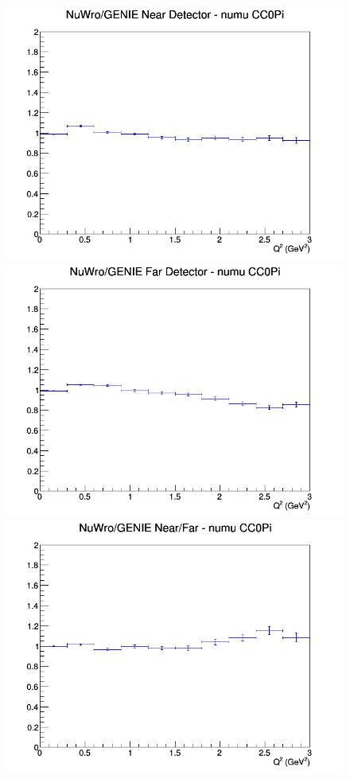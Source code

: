\begin{figure}[h]
\endminipage
\newline
{}
\includegraphics[width=\linewidth]{eff_Q2/FGT/ratios/CC0Pi_NuWro_GENIE_numu_near_Q2.png}
\endminipage
{}
\includegraphics[width=\linewidth]{eff_Q2/FGT/ratios/CC0Pi_NuWro_GENIE_numu_far_Q2.png}
\endminipage
{}
\includegraphics[width=\linewidth]{eff_Q2/FGT/ratios/CC0Pi_NuWro_GENIE_numu_NF_Q2.png}
\endminipage
\newline
\end{figure}
\clearpage
